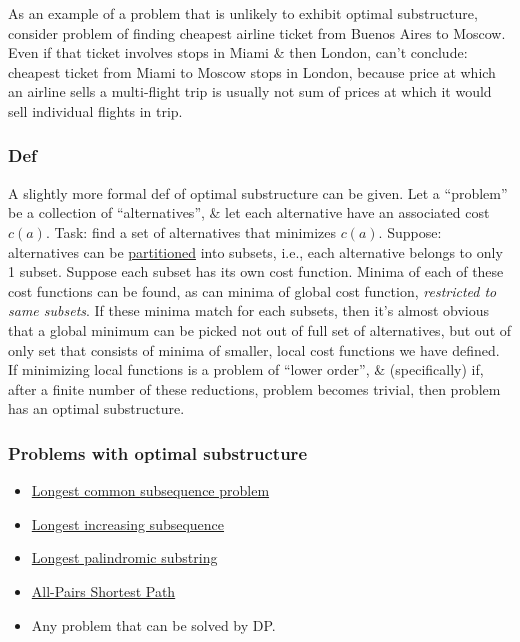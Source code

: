 \documentclass{article}
\begin{document}
As an example of a problem that is unlikely to exhibit optimal substructure, consider problem of finding cheapest airline ticket from Buenos Aires to Moscow. Even if that ticket involves stops in Miami \& then London, can't conclude: cheapest ticket from Miami to Moscow stops in London, because price at which an airline sells a multi-flight trip is usually not sum of prices at which it would sell individual flights in trip.

\subsubsection{Def}
A slightly more formal def of optimal substructure can be given. Let a ``problem'' be a collection of ``alternatives'', \& let each alternative have an associated cost $c(a)$. Task: find a set of alternatives that minimizes $c(a)$. Suppose: alternatives can be \href{https://en.wikipedia.org/wiki/Partition_of_a_set}{partitioned} into subsets, i.e., each alternative belongs to only 1 subset. Suppose each subset has its own cost function. Minima of each of these cost functions can be found, as can minima of global cost function, {\it restricted to same subsets}. If these minima match for each subsets, then it's almost obvious that a global minimum can be picked  not out of full set of alternatives, but out of only set that consists of minima of smaller, local cost functions we have defined. If minimizing local functions is a problem of ``lower order'', \& (specifically) if, after a finite number of these reductions, problem becomes trivial, then problem has an optimal substructure.

\subsubsection{Problems with optimal substructure}

\begin{itemize}
	\item \href{https://en.wikipedia.org/wiki/Longest_common_subsequence_problem}{Longest common subsequence problem}
	\item \href{https://en.wikipedia.org/wiki/Longest_increasing_subsequence}{Longest increasing subsequence}
	\item \href{https://en.wikipedia.org/wiki/Longest_palindromic_substring}{Longest palindromic substring}
	\item \href{https://en.wikipedia.org/wiki/Shortest_path_problem#All-pairs_shortest_paths}{All-Pairs Shortest Path}
	\item Any problem that can be solved by DP.
\end{itemize}
\end{document}
